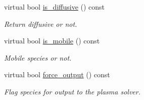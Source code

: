 \begin{DoxyCompactItemize}
virtual bool \hyperlink{classspecies_a74355edfb334921a24f8576624ca03eb}{is\+\_\+diffusive} () const 
\begin{DoxyCompactList}\small\item\em Return diffusive or not. \end{DoxyCompactList}\item 
virtual bool \hyperlink{classspecies_a2a6b7d886f9b8c40d9fd2a4a8e742dc9}{is\+\_\+mobile} () const 
\begin{DoxyCompactList}\small\item\em Mobile species or not. \end{DoxyCompactList}\item 
virtual bool \hyperlink{classspecies_a7c5c3af2768fbeca42f9e9286f722fb0}{force\+\_\+output} () const 
\begin{DoxyCompactList}\small\item\em Flag species for output to the plasma solver. \end{DoxyCompactList}\end{DoxyCompactItemize}
